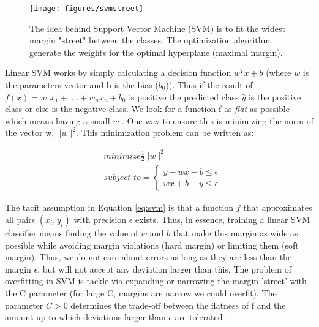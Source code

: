 \documentclass[11pt]{article}
\theoremstyle{definition}
\theoremstyle{remark}
\begin{document}
\begin{figure}[H]
        \centering
        \texttt{[image: figures/svmstreet]}
        \caption{The idea behind Support Vector Machine (SVM) is to fit the widest margin "street" between the classes. The optimization algorithm generate the weights for the optimal hyperplane (maximal margin).} \label{fig:svmstreet} %
        
\end{figure}

Linear SVM works by simply calculating a decision function $w^Tx +b$ (where $w$ is the parameters vector and b is the bias ($b_0$)). Thus if the result of $f(x) = w_{1} x_{1} + ....+ w_{n}x_{n} + b_0$ is positive the predicted class $\hat{y}$ is the positive class or else is the negative class. We look for a function f as \emph{flat} as possible which means having a small $w$ . One way to ensure this is minimizing the norm of the vector w, $||w||^2$. This minimization problem can be written as:

\begin{equation}\label{eq:svm}
\begin{aligned}
 & \textit{minimize} \frac{1}{2} ||w||^2 \\
 & \textit{subject to}=
 \begin{cases}
    y - wx -b \leq \epsilon \\
    wx +b - y \leq \epsilon
  \end{cases}
  \end{aligned}
\end{equation}

The tacit assumption in Equation \ref{eq:svm} is that a function $f$ that approximates all pairs $(x_i, y_i)$ with precision $\epsilon$ exists.
Thus, in essence, training a linear SVM classifier means finding the value of $w$ and $b$ that make this margin as wide as possible while avoiding margin violations (hard margin) or limiting them (soft margin). Thus, we do not care about errors as long as they are less than the margin $\epsilon$, but will not accept any deviation larger than this. 
The problem of overfitting in SVM is tackle via expanding or narrowing the margin 'street' with the C parameter (for large C, margins are narrow we could overfit). The parameter $C > 0$ determines the trade-off between the flatness of f and the amount up to which deviations larger than $\epsilon$ are tolerated \cite{smola2004tutorial}. 
\end{document}
